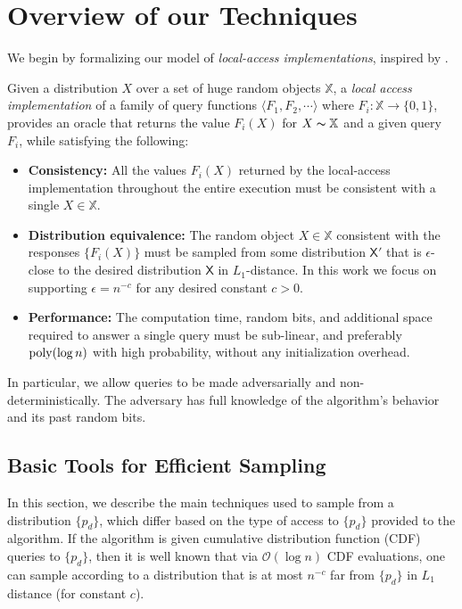 \section{Overview of our Techniques}
\label{sec:overview_of_our_techniques}
We begin by formalizing our model of \emph{local-access implementations}, inspired by \cite{reut}.

\begin{definition}
\label{def:local_access}
Given a distribution $X$ over a set of huge random objects $\mathbb X$, a \emph{local access implementation}
of a family of query functions $\langle F_1, F_2,\cdots \rangle$ where $F_i: \mathbb X\rightarrow \{0,1\}$,
provides an oracle that returns the value $F_i(X)$ for $X\thicksim \mathbb X$ and a given query $F_i$, while satisfying the following:
\begin{itemize}
    \item \textbf{Consistency:}
    All the values $F_i(X)$ returned by the local-access implementation throughout the entire execution
    must be consistent with a single $X\in \mathbb X$.
    \item \textbf{Distribution equivalence:}
    The random object $X\in \mathbb X$ consistent with the responses $\{ F_i(X)\}$ must be sampled from some distribution $\mathsf{X}'$
    that is $\epsilon$-close to the desired distribution $\mathsf{X}$ in $L_1$-distance.
    In this work we focus on supporting $\epsilon = n^{-c}$ for any desired constant $c>0$.
    \item \textbf{Performance:}
    The computation time, random bits, and additional space required to answer a single query must be sub-linear,
    and preferably $\mathrm{poly}(\log n)$ with high probability, without any initialization overhead.
\end{itemize}
\end{definition}
In particular, we allow queries to be made adversarially and non-deterministically.
The adversary has full knowledge of the algorithm's behavior and its past random bits.




\subsection{Basic Tools for Efficient Sampling}
\label{sec:basic_tools_for_efficient_sampling}
In this section, we describe the main techniques used to sample from a distribution $\{ p_d\}$,
which differ based on the type of access to $\{p_d\}$ provided to the algorithm.
If the algorithm is given cumulative distribution function (CDF) queries to $\{p_d\}$,
then it is well known that via $\mathcal O(\log n)$ CDF evaluations, one can sample according
to a distribution that is at most $n^{-c}$ far from $\{p_d\}$ in $L_1$ distance (for constant $c$).

